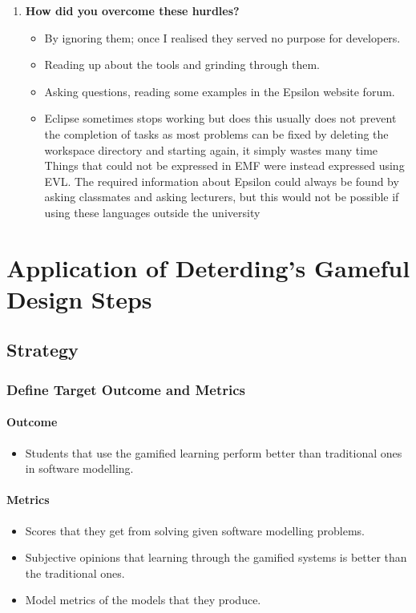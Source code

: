 \documentclass[12pt, a4paper]{report}
\begin{document}
\begin{appendices}
\begin{enumerate}
\item \textbf{How did you overcome these hurdles?}
\begin{itemize}
\item By ignoring them; once I realised they served no purpose for developers.
\item Reading up about the tools and grinding through them.
\item Asking questions, reading some examples in the Epsilon website forum.
\item Eclipse sometimes stops working but does this usually does not prevent the completion of tasks as most problems can be fixed by deleting the workspace directory and starting again, it simply wastes many time Things that could not be expressed in EMF were instead expressed using EVL. The required information about Epsilon could always be found by
asking classmates and asking lecturers, but this would not be possible if using these languages outside the university
\end{itemize}
\end{enumerate}

\chapter{Application of Deterding's Gameful Design Steps}
\label{Application of Deterding's Gameful Design Steps}


\section{Strategy}
\subsection{Define Target Outcome and Metrics}
\subsubsection{Outcome}
\begin{itemize}
\item Students that use the gamified learning perform better than traditional ones in software modelling.
\end{itemize}

\subsubsection{Metrics}
\begin{itemize}
\item Scores that they get from solving given software modelling problems.
\item Subjective opinions that learning through the gamified systems is better than the traditional ones. 
\item Model metrics of the models that they produce.
\end{itemize}


\end{appendices}
\end{document}
